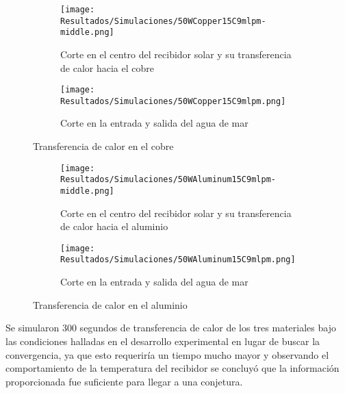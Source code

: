 				\begin{figure}[H]
					\centering
					\begin{subfigure}[t]{\linewidth}
						\centering
						\texttt{[image: Resultados/Simulaciones/50WCopper15C9mlpm-middle.png]}
						\caption{Corte en el centro del recibidor solar y su transferencia de calor hacia el cobre}
						\label{fig:50WCopper15C9mlpm-middle}
					\end{subfigure}
					\hfill
					\begin{subfigure}[t]{\linewidth}
						\centering
						\texttt{[image: Resultados/Simulaciones/50WCopper15C9mlpm.png]}
						\caption{Corte en la entrada y salida del agua de mar}
						\label{fig:50WCopper15C9mlpm}
					\end{subfigure}
					\hfill
					\caption{Transferencia de calor en el cobre}
					\label{fig:copper-heat-transfer}
				\end{figure}
				
				\begin{figure}[H]
					\centering
					\begin{subfigure}[t]{\linewidth}
						\centering
						\texttt{[image: Resultados/Simulaciones/50WAluminum15C9mlpm-middle.png]}
						\caption{Corte en el centro del recibidor solar y su transferencia de calor hacia el aluminio}
						\label{fig:50WAluminum15C9mlpm-middle}
					\end{subfigure}
					\hfill
					\begin{subfigure}[t]{\linewidth}
						\centering
						\texttt{[image: Resultados/Simulaciones/50WAluminum15C9mlpm.png]}
						\caption{Corte en la entrada y salida del agua de mar}
						\label{fig:50WAluminum15C9mlpm}
					\end{subfigure}
					\hfill
					\caption{Transferencia de calor en el aluminio}
					\label{fig:aluminum-heat-transfer}
				\end{figure}
				
				Se simularon 300 segundos de transferencia de calor de los tres materiales bajo las condiciones halladas en el desarrollo experimental en lugar de buscar la convergencia, ya que esto requeriría un tiempo mucho mayor y observando el comportamiento de la temperatura del recibidor se concluyó que la información proporcionada fue suficiente para llegar a una conjetura.
				
